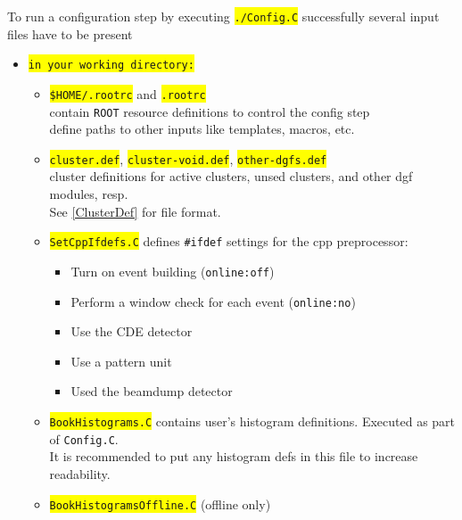 \documentclass[10pt]{article}
\newcommand{\yellow}[1]{\colorbox{yellow}{\texttt{#1}}}
\begin{document}
To run a configuration step by executing \yellow{./Config.C} successfully several input files have to be present
\begin{itemize}
\setlength{\rightmargin}{1em}%
\setlength{\leftmargin}{2em}%
\setlength{\itemsep}{0pt}%
\setlength{\parskip}{1mm}%
\setlength{\partopsep}{0pt}%
\setlength{\parsep}{0pt}%
\setlength{\topsep}{0pt}%
\item	\yellow{in your working directory:}
	\begin{itemize}
	\setlength{\rightmargin}{1em}%
	\setlength{\leftmargin}{2em}%
	\setlength{\itemsep}{0pt}%
	\setlength{\parskip}{1mm}%
	\setlength{\partopsep}{0pt}%
	\setlength{\parsep}{0pt}%
	\setlength{\topsep}{0pt}%
	\item	\yellow{\$HOME/.rootrc} and \yellow{.rootrc}\\
		contain \texttt{ROOT} resource definitions to control the config step\\
		define paths to other inputs like templates, macros, etc.
	\item	\yellow{cluster.def}, \yellow{cluster-void.def}, \yellow{other-dgfs.def}\\
		cluster definitions for active clusters, unsed clusters, and other dgf modules, resp.\\
		See \ref{ClusterDef} for file format.
	\item	\yellow{SetCppIfdefs.C}
		defines \texttt{\#ifdef} settings for the cpp preprocessor:
		\begin{itemize}
		\setlength{\rightmargin}{1em}%
		\setlength{\leftmargin}{2em}%
		\setlength{\itemsep}{0pt}%
		\setlength{\parskip}{1mm}%
		\setlength{\partopsep}{0pt}%
		\setlength{\parsep}{0pt}%
		\setlength{\topsep}{0pt}%
		\item	Turn on event building (\texttt{online:off})
		\item	Perform a window check for each event (\texttt{online:no})
		\item	Use the CDE detector 
		\item	Use a pattern unit
		\item	Used the beamdump detector
		\end{itemize}
	\item	\yellow{BookHistograms.C}
		contains user's histogram definitions. Executed as part of \texttt{Config.C}.\\
		It is recommended to put any histogram defs in this file to increase readability.
	\item	\yellow{BookHistogramsOffline.C} (offline only)\\

\end{itemize}
\end{itemize}
\end{document}
